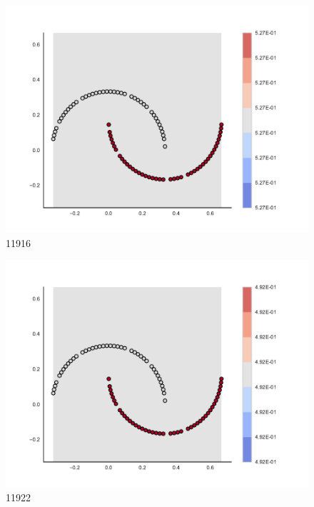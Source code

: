\begin{subfigure}[b]{0.09\textwidth}
    \includegraphics[clip, trim=2.35cm 1.75cm 4.5cm 0cm,width=\textwidth]{img/convergence/11916.pdf}
    \caption{11916}
    \label{fig:convergence_11916}
\end{subfigure}
%
\begin{subfigure}[b]{0.09\textwidth}
    \includegraphics[clip, trim=2.35cm 1.75cm 4.5cm 0cm,width=\textwidth]{img/convergence/11922.pdf}
    \caption{11922}
    \label{fig:convergence_11922}
\end{subfigure}
%
